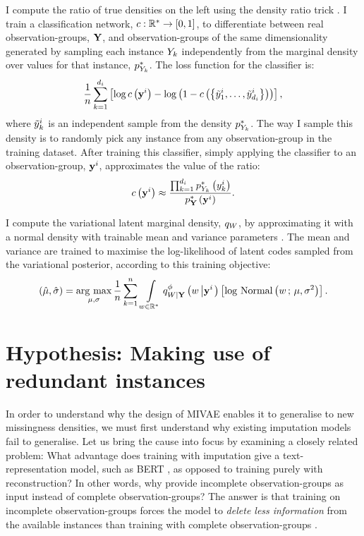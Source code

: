 \documentclass[../thesis.tex]{subfiles}
\begin{document}
I compute the ratio of true densities on the left using the density ratio trick \citep{sugiyamaDensityRatioEstimation2012}. I train a classification network, $c: \mathbb{R}^* \to [0, 1]$, to differentiate between real observation-groups, $\mygroup{\myrv{y}}$, and observation-groups of the same dimensionality generated by sampling each instance $\myrv{y}_k$ independently from the marginal density over values for that instance, $\myfunc{p}^*_{\myrv{y}_k}$. The loss function for the classifier is:
\[
    \frac{1}{n} \sum_{k=1}^{d_i} \left[ \log c \left( \mathbf{{y}}^i \right) - \log \left( 1 - c \left( \left\{ \tilde{y}^i_1, \dots, \tilde{y}^i_{d_i} \right\} \right) \right) \right],
\]
where $\tilde{y}^i_k$ is an independent sample from the density $\myfunc{p}^*_{\myrv{y}_k}$. The way I sample this density is to randomly pick any instance from any observation-group in the training dataset. After training this classifier, simply applying the classifier to an observation-group, $\mathbf{{y}}^i$, approximates the value of the ratio: 
\[
    \myfunc{c}\left( \mygroup{\myvect{y}}^i \right) \approx \frac{\prod_{k=1}^{\mycnt{d}_i} \myfunc{p}^{*}_{\myrv{y}_k} \left( \myvect{y}^i_k \right)}{\myfunc{p}^{*}_{\mygroup{\myrv{y}}} \left( \mygroup{\myvect{y}}^i \right)}.
\]

I compute the variational latent marginal density, $\myfunc{q}_{\myrv{w}}$, by approximating it with a normal density with trainable mean and variance parameters \citep{bleiVariationalInferenceReview2017}. The mean and variance are trained to maximise the log-likelihood of latent codes sampled from the variational posterior, according to this training objective:
\[
    \left(\hat{\mu}, \hat{\sigma} \right) = \underset{\mu, \sigma}{\mathrm{arg ~ max}} \, \frac{1}{\mycnt{n}} \sum_{k=1}^{\mycnt{n}} \, \int\limits_{\myvect{w} \in \mathbb{R}^{*}} \myfunc{q}^{\phi}_{\myrv{w} | \mygroup{\myrv{y}}} \left( \myvect{w} \left\vert \mygroup{\myvect{y}}^i \right. \right) \left[ \log \, \mathrm{Normal} \left( \myvect{w} \, ; \, \mu, \sigma^2 \right) \right].
\]

\section{Hypothesis: Making use of redundant instances}

In order to understand why the design of MIVAE enables it to generalise to new missingness densities, we must first understand why existing imputation models fail to generalise. Let us bring the cause into focus by examining a closely related problem: What advantage does training with imputation give a text-representation model, such as BERT \citep{devlinBERTPretrainingDeep2019}, as opposed to training purely with reconstruction? In other words, why provide incomplete observation-groups as input instead of complete observation-groups? The answer is that training on incomplete observation-groups forces the model to \textit{delete less information} from the available instances than training with complete observation-groups \citep{heMaskedAutoencodersAre2022,liMaskedModelingSelfsupervised2024}. 
\end{document}
